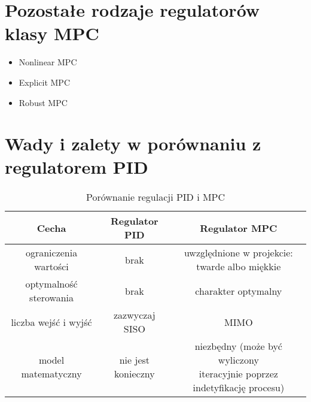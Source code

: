 \section{Pozostałe rodzaje regulatorów klasy MPC} \label{sec:other}

\begin{itemize}
	\item Nonlinear MPC
	\item Explicit MPC
    \item Robust MPC
\end{itemize}

\section{Wady i zalety w porównaniu z regulatorem PID} \label{sec:comparison}

\begin{table}[htb]
	\centering
	\begin{tabular}{c|c|c}
	\toprule
	Cecha & Regulator PID & Regulator MPC \\ \bottomrule
	ograniczenia wartości & brak & \makecell{uwzględnione w projekcie:\\twarde albo miękkie} \\ \midrule
	optymalność sterowania & brak & charakter optymalny \\ \midrule
	liczba wejść i wyjść & zazwyczaj SISO & MIMO \\ \midrule
	model matematyczny & nie jest konieczny & \makecell{niezbędny (może być wyliczony \\ iteracyjnie poprzez indetyfikację procesu)} \\
	\bottomrule
	\end{tabular}
\caption{Porównanie regulacji PID i MPC}
\label{tab:comp_pid_mpc}
\end{table}
